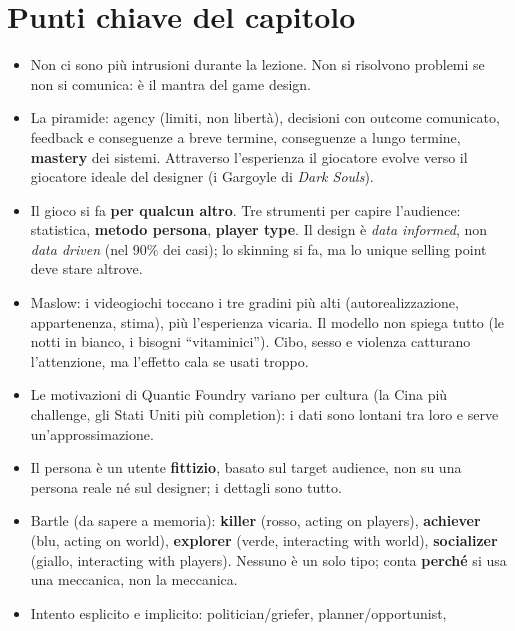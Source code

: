 \section*{Punti chiave del capitolo}

\begin{itemize}
  \item Non ci sono più intrusioni durante la lezione. Non si risolvono problemi se
        non si comunica: è il mantra del game design.
  \item La piramide: agency (limiti, non libertà), decisioni con outcome comunicato,
        feedback e conseguenze a breve termine, conseguenze a lungo termine,
        \textbf{mastery} dei sistemi. Attraverso l'esperienza il giocatore evolve
        verso il giocatore ideale del designer (i Gargoyle di \emph{Dark Souls}).
  \item Il gioco si fa \textbf{per qualcun altro}. Tre strumenti per capire
        l'audience: statistica, \textbf{metodo persona}, \textbf{player type}. Il
        design è \emph{data informed}, non \emph{data driven} (nel 90\% dei casi); lo
        skinning si fa, ma lo unique selling point deve stare altrove.
  \item Maslow: i videogiochi toccano i tre gradini più alti (autorealizzazione,
        appartenenza, stima), più l'esperienza vicaria. Il modello non spiega tutto
        (le notti in bianco, i bisogni ``vitaminici''). Cibo, sesso e violenza
        catturano l'attenzione, ma l'effetto cala se usati troppo.
  \item Le motivazioni di Quantic Foundry variano per cultura (la Cina più challenge,
        gli Stati Uniti più completion): i dati sono lontani tra loro e serve
        un'approssimazione.
  \item Il persona è un utente \textbf{fittizio}, basato sul target audience, non su
        una persona reale né sul designer; i dettagli sono tutto.
  \item Bartle (da sapere a memoria): \textbf{killer} (rosso, acting on players),
        \textbf{achiever} (blu, acting on world), \textbf{explorer} (verde,
        interacting with world), \textbf{socializer} (giallo, interacting with
        players). Nessuno è un solo tipo; conta \textbf{perché} si usa una meccanica,
        non la meccanica.
  \item Intento esplicito e implicito: politician/griefer, planner/opportunist,

\end{itemize}
